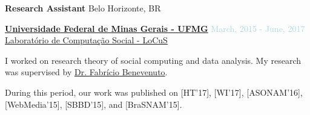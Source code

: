 \textbf{Research Assistant} \hfill {Belo Horizonte, BR}
\begin{outerlist}

\item[] \href{https://ufmg.br/}{\textbf{Universidade Federal de Minas Gerais - UFMG}}  \hfill {\textcolor{lightblue}{March, 2015 - June, 2017}}
\\ \href{https://www.dcc.ufmg.br/dcc/?q=pt-br/node/2728}{Laboratório de Computação Social - LoCuS}  \medskip 

        \begin{innerlist}[-]
        \item I worked on research theory of social computing and data analysis. My research was supervised by \href{https://homepages.dcc.ufmg.br/~fabricio/}{Dr. Fabrício Benevenuto}.
        \item During this period, our work was published on [HT'17], [WI'17], [ASONAM'16], [WebMedia'15], [SBBD'15], and [BraSNAM'15]. 
        \end{innerlist}

\end{outerlist}

\medskip



